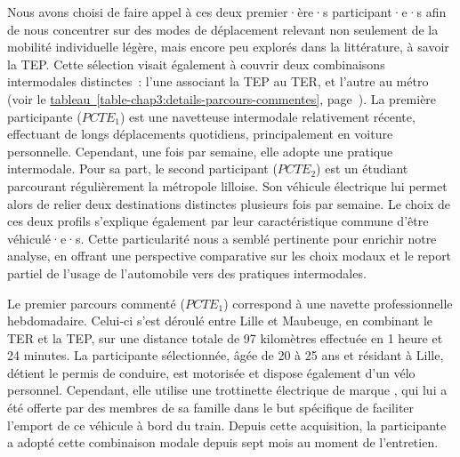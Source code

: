 \begin{refsegment}

Nous avons choisi de faire appel à ces deux premier·ère·s participant·e·s afin de nous concentrer sur des modes de déplacement relevant non seulement de la mobilité individuelle légère, mais encore peu explorés dans la littérature, à savoir la \acrshort{TEP}. Cette sélection visait également à couvrir deux combinaisons intermodales distinctes~: l’une associant la \acrshort{TEP} au \acrshort{TER}, et l’autre au métro (voir le \hyperref[table-chap3:details-parcours-commentes]{tableau~\ref{table-chap3:details-parcours-commentes}}, page~\pageref{table-chap3:details-parcours-commentes}). La première participante (\(PCTE_{1}\)) est une navetteuse intermodale relativement récente, effectuant de longs déplacements quotidiens, principalement en voiture personnelle. Cependant, une fois par semaine, elle adopte une pratique intermodale. Pour sa part, le second participant (\(PCTE_{2}\)) est un étudiant parcourant régulièrement la métropole lilloise. Son véhicule électrique lui permet alors de relier deux destinations distinctes plusieurs fois par semaine. Le choix de ces deux profils s’explique également par leur caractéristique commune d’être véhiculé·e·s. Cette particularité nous a semblé pertinente pour enrichir notre analyse, en offrant une perspective comparative sur les choix modaux et le report partiel de l’usage de l’automobile vers des pratiques intermodales.%

Le premier parcours commenté (\(PCTE_{1}\)) correspond à une navette professionnelle hebdomadaire. Celui-ci s’est déroulé entre Lille et Maubeuge, en combinant le \acrshort{TER} et la \acrshort{TEP}, sur une distance totale de 97 kilomètres effectuée en 1 heure et 24 minutes. La participante sélectionnée, âgée de 20 à 25 ans et résidant à Lille, détient le permis de conduire, est motorisée et dispose également d’un vélo personnel. Cependant, elle utilise une trottinette électrique de marque , qui lui a été offerte par des membres de sa famille dans le but spécifique de faciliter l'emport de ce véhicule à bord du train. Depuis cette acquisition, la participante a adopté cette combinaison modale depuis sept mois au moment de l’entretien.%


\end{refsegment}
